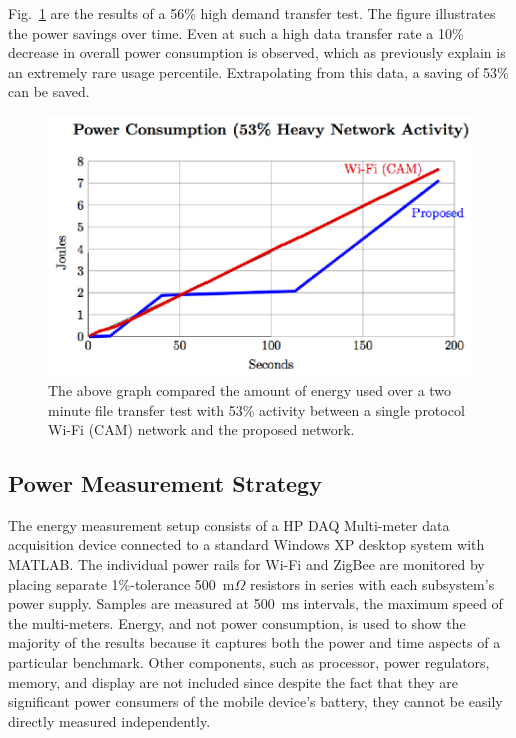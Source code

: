 \documentclass[conference]{IEEEtran}
\begin{document}
Fig.~\ref{f:compare_results2} are the results of a 56\% high demand
transfer test.  The figure illustrates the power savings over time.
Even at such a high data transfer rate a 10\% decrease in overall
power consumption is observed, which as previously explain is an
extremely rare usage percentile.  Extrapolating from this data, a
saving of 53\% can be saved.
\begin{figure}[b]
\begin{center}
\includegraphics[scale=0.70]{energy_con.eps}
\caption{The above graph compared the amount of energy used over a two minute file transfer test with 53\% activity between a single protocol Wi-Fi (CAM) network and the proposed network.}
\end{center}\label{f:compare_results2}
\end{figure}


\subsection{Power Measurement Strategy}
The energy measurement setup consists of a HP DAQ Multi-meter data
acquisition device connected to a standard Windows XP desktop system
with MATLAB. The individual power rails for Wi-Fi and ZigBee are
monitored by placing separate 1\%-tolerance 500~m$\Omega$ resistors
in series with each subsystem's power supply. Samples are measured
at 500~ms intervals, the maximum speed of the multi-meters.  Energy,
and not power consumption, is used to show the majority of the
results because it captures both the power and time aspects of a
particular benchmark. Other components, such as processor, power
regulators, memory, and display are not included since despite the
fact that they are significant power consumers of the mobile
device's battery, they cannot be easily directly measured
independently.
\end{document}
